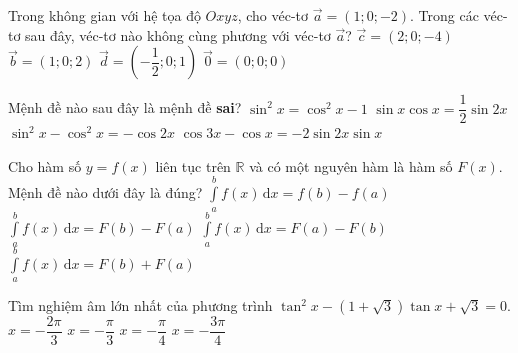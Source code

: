 	\begin{ex}%
		Trong không gian với hệ tọa độ $Oxyz$, cho véc-tơ $\overrightarrow{a}=(1;0;-2)$. Trong các véc-tơ sau đây, véc-tơ nào không cùng phương với véc-tơ $\overrightarrow{a}$?
		\choice
		{$\overrightarrow{c}=(2;0;-4)$}
		{\True $\overrightarrow{b}=(1;0;2)$}
		{$\overrightarrow{d}=\left(-\dfrac{1}{2};0;1\right)$}
		{$\overrightarrow{0}=(0;0;0)$}
	\end{ex}
	\begin{ex}%
		Mệnh đề nào sau đây là mệnh đề \textbf{sai}?
		\choice
		{\True $\sin^2x=\cos^2x-1$}
		{$\sin x\cos x=\dfrac{1}{2}\sin2x$}
		{$\sin^2x-\cos^2x=-\cos2x$}
		{$\cos3x-\cos x=-2\sin2x\sin x$}
	\end{ex}
	\begin{ex}%
		Cho hàm số $y=f(x)$ liên tục trên $\mathbb{R}$ và có một nguyên hàm là hàm số $F(x)$. Mệnh đề nào dưới đây là đúng?
		\choice
		{$\displaystyle\int\limits_a^b f(x)\mathrm{\,d}x=f(b)-f(a)$}
		{\True $\displaystyle\int\limits_a^b f(x)\mathrm{\,d}x=F(b)-F(a)$}
		{$\displaystyle\int\limits_a^b f(x)\mathrm{\,d}x=F(a)-F(b)$}
		{$\displaystyle\int\limits_a^b f(x)\mathrm{\,d}x=F(b)+F(a)$}
	\end{ex}
	\begin{ex}%
		Tìm nghiệm âm lớn nhất của phương trình $\tan^2x-(1+\sqrt{3})\tan x+\sqrt{3}=0$.
		\choice
		{\True $x=-\dfrac{2\pi}{3}$}
		{$x=-\dfrac{\pi}{3}$}
		{$x=-\dfrac{\pi}{4}$}
		{$x=-\dfrac{3\pi}{4}$}
	\end{ex}
